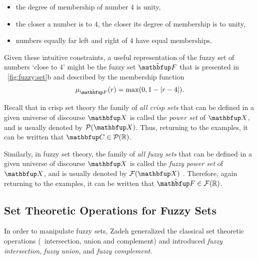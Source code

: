\begin{itemize}
\item the degree of membership of number $4$ is unity, 
\item the closer a number is to $4$, the closer its degree of membership is to unity,
\item numbers equally far left and right of $4$ have equal memberships.
\end{itemize}

Given these intuitive constraints, a useful representation of the fuzzy set of numbers `close to 4' might be the fuzzy set $\fset{F}$ that is presented in \fig~\ref{fig:fuzzy:set}b and described by the membership function
%
\begin{equation}
\mu_\fset{F}(r)=\max(0,1-|r-4|).
\end{equation} 

Recall that in crisp set theory the family of \emph{all crisp sets} that can be defined in a given universe of discourse $\set{X}$ is called the \emph{power set} of $\set{X}$, and is usually denoted by $\powset{\set{X}}$. Thus, returning to the examples, it can be written that $\set{C} \in \powset{\R}$. 

Similarly, in fuzzy set theory, the family of \emph{all fuzzy sets} that can be defined in a given universe of discourse $\set{X}$ is called the \emph{fuzzy power set} of $\set{X}$, and is usually denoted by $\fpowset{\set{X}}$ \cite{klir:1995}. Therefore, again returning to the examples, it can be written that $\fset{F} \in \fpowset{\R}$.

\subsection{Set Theoretic Operations for Fuzzy Sets}
In order to manipulate fuzzy sets, Zadeh \cite{zadeh:1965} generalized the classical set theoretic operations (\ie\ intersection, union and complement) and introduced \emph{fuzzy intersection}, \emph{fuzzy union}, and \emph{fuzzy complement}. 

